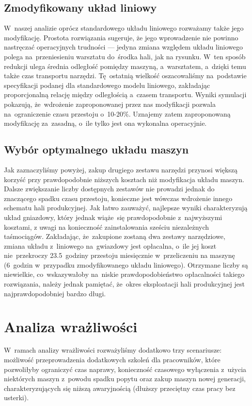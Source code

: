 \documentclass[12pt, a4paper, oneside]{mwart} %
\begin{document}
\subsection{Zmodyfikowany układ liniowy}
W~naszej analizie oprócz standardowego układu liniowego rozważamy także jego modyfikację. Prostota rozwiązania sugeruje, że jego wprowadzenie nie powinno nastręczać operacyjnych trudności --- jedyna zmiana względem układu liniowego polega na~przeniesieniu warsztatu do~środka hali, jak na rysunku. W~ten sposób redukcji ulega średnia odległość pomiędzy maszyną, a~warsztatem, a~dzięki temu także czas transportu narzędzi. Tę~ostatnią wielkość oszacowaliśmy na~podstawie specyfikacji podanej dla standardowego modelu liniowego, zakładając proporcjonalną relację między odległością a~czasem transportu. Wyniki symulacji pokazują, że~wdrożenie zaproponowanej przez nas modyfikacji pozwala na~ograniczenie czasu przestoju o~10-20\%. Uznajemy zatem zaproponowaną modyfikację za~zasadną, o~ile tylko jest ona wykonalna operacyjnie.

\subsection{Wybór optymalnego układu maszyn}
Jak zaznaczyliśmy powyżej, zakup drugiego zestawu narzędzi przynosi większą korzyść przy prawdopodobnie niższych kosztach niż modyfikacja układu maszyn. Dalsze zwiększanie liczby dostępnych zestawów nie prowadzi jednak do znaczącego spadku czasu przestoju, konieczne jest wówczas wdrożenie innego schematu hali produkcyjnej. Jak łatwo zauważyć, najlepsze wyniki charakteryzują układ gniazdowy, który jednak wiąże~się prawdopodobnie z~najwyższymi kosztami, z uwagi na konieczność zainstalowania sześciu niezależnych taśmociągów. Zakładając, że~zakupione zostaną dwa zestawy narzędziowe, zmiana układu z~liniowego na~gwiazdowy jest opłacalna, o~ile jej koszt nie~przekroczy 23.5~godziny przestoju miesięcznie w~przeliczeniu na maszynę (6~godzin w~przypadku zmodyfikowanego układu liniowego). Otrzymane liczby są niewielkie, co~wskazywałoby na~niskie prawdopodobieństwo opłacalności takiego rozwiązania, należy jednak pamiętać, że~okres eksploatacji hali produkcyjnej jest najprawdopodobniej bardzo długi.

\section{Analiza wrażliwości}
W~ramach analizy wrażliwości rozważyliśmy dodatkowo trzy scenariusze: możliwość przeprowadzenia dodatkowych szkoleń dla pracowników, które pozwoliłyby ograniczyć czas naprawy, konieczność czasowego wyłączenia z~użycia niektórych maszyn z~powodu spadku popytu oraz zakup maszyn nowej generacji, charakteryzujących się niższą awaryjnością (dłuższy przeciętny czas pracy bez usterki).
\end{document}
